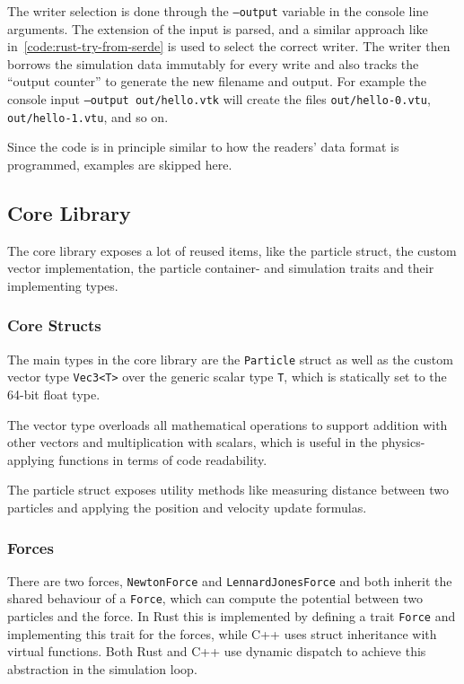 \documentclass[11pt,
               a4paper,
               bibtotoc,
               idxtotoc,
               headsepline,
               footsepline,
               footexclude,
               BCOR12mm,
               DIV13,
               openany,   %
               ]
               {scrbook}
\begin{document}
The writer selection is done through the \texttt{--output} variable in the console line arguments. The extension of the input is parsed, and a similar approach like in~\autoref{code:rust-try-from-serde} is used to select the correct writer. The writer then borrows the simulation data immutably for every write and also tracks the ``output counter'' to generate the new filename and output. For example the console input \texttt{--output out/hello.vtk} will create the files \texttt{out/hello-0.vtu}, \texttt{out/hello-1.vtu}, and so on.

Since the code is in principle similar to how the readers' data format is programmed, examples are skipped here.

\subsection{Core Library}

The core library exposes a lot of reused items, like the particle struct, the custom vector implementation, the particle container- and simulation traits and their implementing types.

\subsubsection{Core Structs}

The main types in the core library are the \texttt{Particle} struct as well as the custom vector type \texttt{Vec3<T>} over the generic scalar type \texttt{T}, which is statically set to the 64-bit float type.

The vector type overloads all mathematical operations to support addition with other vectors and multiplication with scalars, which is useful in the physics-applying functions in terms of code readability.

The particle struct exposes utility methods like measuring distance between two particles and applying the position and velocity update formulas.

\subsubsection{Forces}

There are two forces, \texttt{NewtonForce} and \texttt{LennardJonesForce} and both inherit the shared behaviour of a \texttt{Force}, which can compute the potential between two particles and the force. In Rust this is implemented by defining a trait \texttt{Force} and implementing this trait for the forces, while C++ uses struct inheritance with virtual functions. Both Rust and C++ use dynamic dispatch to achieve this abstraction in the simulation loop.
\end{document}
